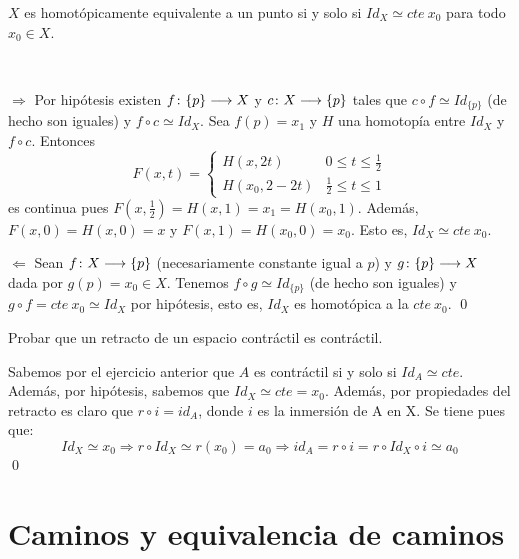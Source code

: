 \documentclass[GTS.tex]{subfiles}
\begin{document}
\begin{ejer} $X$ es homotópicamente equivalente a un punto si y solo si $Id_X\simeq cte\ x_0$ para todo $x_0\in X$.
\end{ejer}
\begin{solucion}\ 

$\boxed{\Rightarrow}$ Por hipótesis  existen $f\colon{\{p\}}\longrightarrow{X}$ y $c\colon{X}\longrightarrow{\{p\}}$ tales que $c\circ f\simeq Id_{\{p\}}$ (de hecho son iguales) y $f\circ c\simeq Id_X$. Sea $f(p)=x_1$ y $H$ una homotopía entre $Id_X$ y $f\circ c$. Entonces
\[
F(x,t)=\begin{cases}
H(x,2t) & 0\leq t\leq\frac{1}{2}\\
H(x_0,2-2t) & \frac{1}{2}\leq t\leq 1
\end{cases}
\]
es continua pues $F(x,\frac{1}{2})=H(x,1)=x_1=H(x_0,1)$. Además, $F(x,0)=H(x,0)=x$ y $F(x,1)=H(x_0,0)=x_0$. Esto es, $Id_X\simeq cte\ x_0$.

$\boxed{\Leftarrow}$ Sean $f\colon{X}\longrightarrow{\{p\}}$ (necesariamente constante igual a $p$) y $g\colon{\{p\}}\longrightarrow{X}$ dada por $g(p)= x_0\in X$. Tenemos $f\circ g\simeq Id_{\{p\}}$ (de hecho son iguales) y $g\circ f=cte\ x_0\simeq Id_X$ por hipótesis, esto es, $Id_X$ es homotópica a la $cte\ x_0$. \qed
\end{solucion}

\begin{ejer}
Probar que un retracto de un espacio contráctil es contráctil.
\end{ejer}
\begin{solucion}
Sabemos por el ejercicio anterior que $A$ es contráctil si y solo si $Id_A\simeq cte$. Además, por hipótesis, sabemos que $Id_X \simeq cte = x_0$. Además, por propiedades del retracto es claro que $r \circ i = id_A$, donde $i$ es la inmersión de A en X. Se tiene pues que:
\[
Id_X \simeq x_0 \Rightarrow r \circ Id_X \simeq r(x_0) = a_0 \Rightarrow id_A = r \circ i = r \circ Id_X \circ i \simeq a_0 
\]
\qed
\end{solucion}

\section{Caminos y equivalencia de caminos}
\end{document}
